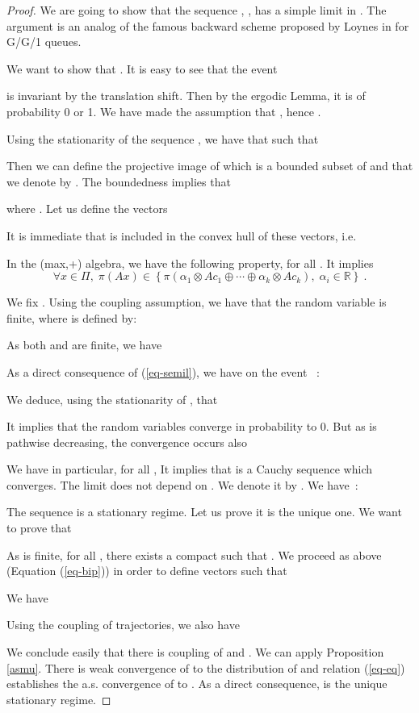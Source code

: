 \documentclass[11pt,titlepage]{article}
\def\Blackboardfont{\mathbb}
\def\R{{\Blackboardfont R}}
\def\eref#1{(\ref{#1})}
\newcommand{\parag}{\medskip\noindent}
\begin{document}
\begin{proof}
We are going to show that the sequence
, ,
has a simple limit in . 
The argument is an analog of the famous backward scheme proposed by 
Loynes in \cite{loyn} for G/G/1 queues. 


We want to show that
.
It is easy to see that the event 

is invariant by the translation shift.
Then by the ergodic Lemma, it is of probability 
0 or 1. We have made the assumption that , hence 
.

Using the stationarity of the sequence , we have that  such that

Then we can define the projective image of  which is a bounded subset of  and that we denote by .
The boundedness implies that

where . Let us define the vectors

It is
immediate that  is included in the convex hull of these vectors, i.e.

In the (max,+) algebra, we have the following property, 
for all . It implies
\begin {equation}
\label{eq-semil}
\forall x \in \Pi, \; \pi (Ax) \in \left\{\pi(\alpha_1 \otimes Ac_1 \oplus 
\cdots \oplus \alpha_k
\otimes Ac_k),\;\alpha_i \in \R\right\}\:.
\end {equation} 




We fix . Using the coupling assumption, we have that the random
variable  is  
finite, where  is defined by:


As both  and  are  finite, we have

As a direct consequence of  \eref{eq-semil}, we have
on the event ~:

We deduce, using the stationarity of , that
 

It implies that the random variables  converge
in probability to 0. But as  is pathwise decreasing, the convergence occurs also
 

\parag

We have in particular, for all , 
 It implies that  is a Cauchy sequence which converges. 
The limit does not depend on . We denote it by . We have~:


The sequence  is a stationary regime. Let us prove 
it is the unique one. 
We want to prove that

As  is  finite, for all , there exists a compact
 such that . We
proceed as above (Equation \eref{eq-bip}) in order to
define vectors  such that 

We have

Using the coupling of trajectories, we also have

We conclude easily that
there is coupling of  and . 
We can apply Proposition
\ref{asmu}. There is weak convergence of  to
the distribution of  and relation (\ref{eq-eq}) establishes the a.s. 
convergence of  to . 
As a direct consequence, 
 is the unique stationary regime.
\end{proof}
\end{document}
